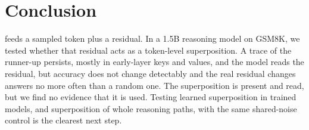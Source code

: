 \section{Conclusion}\label{sec:conclusion}

\GST{} feeds a sampled token plus a residual.
In a 1.5B reasoning model on GSM8K, we tested whether that residual acts as a token-level superposition. %
A trace of the runner-up persists, mostly in early-layer keys and values, and the model reads the residual, but
accuracy does not change detectably and the real residual changes answers no more often than a random one.
The superposition is present and read, but we find no evidence that it is used.
Testing learned superposition in trained models, and superposition of whole reasoning paths, with the same
shared-noise control is the clearest next step.
